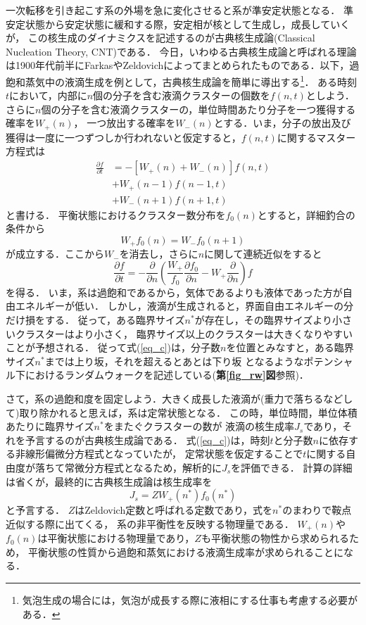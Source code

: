 \documentclass[topics,b5paper,papersize,twocolumn]{jsarticle}
\begin{document}
一次転移を引き起こす系の外場を急に変化させると系が準安定状態となる．
準安定状態から安定状態に緩和する際，安定相が核として生成し，成長していくが，
この核生成のダイナミクスを記述するのが古典核生成論(Classical Nucleation Theory, CNT)である．
今日，いわゆる古典核生成論と呼ばれる理論は1900年代前半にFarkasやZeldovichによってまとめられたものである\cite{Farkas, Zeldovich}．以下，過飽和蒸気中の液滴生成を例として，古典核生成論を簡単に導出する\footnote{
気泡生成の場合には，気泡が成長する際に液相にする仕事も考慮する必要がある\cite{Blander}．
}．
ある時刻$t$において，内部に$n$個の分子を含む液滴クラスターの個数を$f(n,t)$としよう．
さらに$n$個の分子を含む液滴クラスターの，単位時間あたり分子を一つ獲得する確率を$W_+(n)$，
一つ放出する確率を$W_-(n)$とする．いま，分子の放出及び獲得は一度に一つずつしか行われないと仮定すると，$f(n,t)$に関するマスター方程式は
\begin{align}
\frac{\partial f}{\partial t} &= 
-\left[ W_+(n) + W_-(n)\right] f(n,t) \nonumber \\
&+ W_+(n-1)f(n-1,t)  \nonumber \\
&+ W_-(n+1)f(n+1,t)
\end{align}
と書ける．
平衡状態におけるクラスター数分布を$f_0(n)$とすると，詳細釣合の条件から
\begin{equation}
W_+ f_0(n) = W_- f_0(n+1)
\end{equation}
が成立する．ここから$W_-$を消去し，さらに$n$に関して連続近似をすると
\begin{equation}
\frac{\partial f}{\partial t} = - \frac{\partial}{\partial n}
\left(
\displaystyle \frac{W_+}{f_0} \frac{\partial f_0}{\partial n}
- W_+ \frac{\partial}{\partial n}
\right) f
\label{eq_c}
\end{equation}
を得る．
いま，系は過飽和であるから，気体であるよりも液体であった方が自由エネルギーが低い．
しかし，液滴が生成されると，界面自由エネルギーの分だけ損をする．
従って，ある臨界サイズ$n^*$が存在し，その臨界サイズより小さいクラスターはより小さく，
臨界サイズ以上のクラスターは大きくなりやすいことが予想される．
従って式(\ref{eq_c})は，分子数$n$を位置とみなすと，ある臨界サイズ$n^*$までは上り坂，それを超えるとあとは下り坂
となるようなポテンシャル下におけるランダムウォークを記述している(\textbf{第\ref{fig_rw}図}参照)．

さて，系の過飽和度を固定しよう．大きく成長した液滴が(重力で落ちるなどして)取り除かれると思えば，系は定常状態となる．
この時，単位時間，単位体積あたりに臨界サイズ$n^*$をまたぐクラスターの数が
液滴の核生成率$J_s$であり，それを予言するのが古典核生成論である．
式(\ref{eq_c})は，時刻$t$と分子数$n$に依存する非線形偏微分方程式となっていたが，
定常状態を仮定することで$t$に関する自由度が落ちて常微分方程式となるため，解析的に$J_s$を評価できる．
計算の詳細は省くが，最終的に古典核生成論は核生成率を
\begin{equation}
J_s = Z W_+(n^*) f_0(n^*)
\end{equation}
と予言する．
$Z$はZeldovich定数と呼ばれる定数であり，式を$n^*$のまわりで鞍点近似する際に出てくる，
系の非平衡性を反映する物理量である．
$W_+(n)$や$f_0(n)$は平衡状態における物理量であり，$Z$も平衡状態の物性から求められるため，
平衡状態の性質から過飽和蒸気における液滴生成率が求められることになる．
\end{document}
